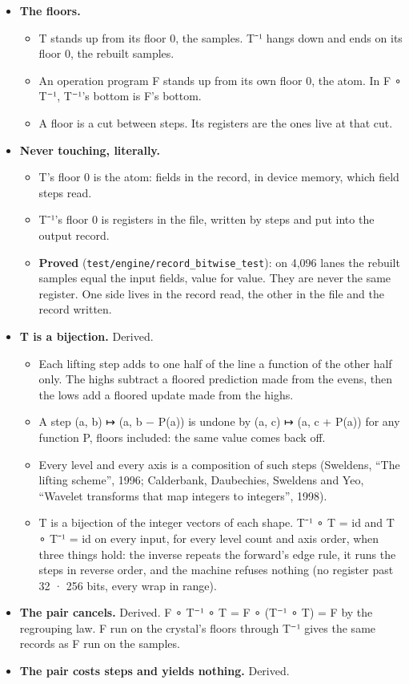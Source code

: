 \begin{itemize}
\item \textbf{The floors.}

\begin{itemize}
\item T stands up from its floor 0, the samples. T⁻¹ hangs down and ends on its floor 0, the rebuilt samples.
\item An operation program F stands up from its own floor 0, the atom. In F ∘ T⁻¹, T⁻¹'s bottom is F's bottom.
\item A floor is a cut between steps. Its registers are the ones live at that cut.
\end{itemize}
\item \textbf{Never touching, literally.}

\begin{itemize}
\item T's floor 0 is the atom: fields in the record, in device memory, which field steps read.
\item T⁻¹'s floor 0 is registers in the file, written by steps and put into the output record.
\item \textbf{Proved} (\texttt{test/\allowbreak{}engine/\allowbreak{}record\_\allowbreak{}bitwise\_\allowbreak{}test}): on 4,096 lanes the rebuilt samples equal the input fields, value for value. They are never the same register. One side lives in the record read, the other in the file and the record written.
\end{itemize}
\item \textbf{T is a bijection.} Derived.

\begin{itemize}
\item Each lifting step adds to one half of the line a function of the other half only. The highs subtract a floored prediction made from the evens, then the lows add a floored update made from the highs.
\item A step (a, b) ↦ (a, b − P(a)) is undone by (a, c) ↦ (a, c + P(a)) for any function P, floors included: the same value comes back off.
\item Every level and every axis is a composition of such steps (Sweldens, “The lifting scheme”, 1996; Calderbank, Daubechies, Sweldens and Yeo, “Wavelet transforms that map integers to integers”, 1998).
\item T is a bijection of the integer vectors of each shape. T⁻¹ ∘ T = id and T ∘ T⁻¹ = id on every input, for every level count and axis order, when three things hold: the inverse repeats the forward's edge rule, it runs the steps in reverse order, and the machine refuses nothing (no register past 32 · 256 bits, every wrap in range).
\end{itemize}
\item \textbf{The pair cancels.} Derived. F ∘ T⁻¹ ∘ T = F ∘ (T⁻¹ ∘ T) = F by the regrouping law. F run on the crystal's floors through T⁻¹ gives the same records as F run on the samples.
\item \textbf{The pair costs steps and yields nothing.} Derived.


\end{itemize}
